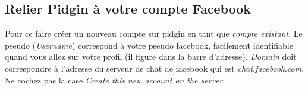 \documentclass[a4paper]{article}
\begin{document}
\subsection{Relier Pidgin à votre compte Facebook}
Pour ce faire créer un nouveau compte sur pidgin en tant que \emph{compte existant}.
Le pseudo (\emph{Username}) correspond à votre pseudo facebook, facilement identifiable quand vous
allez sur votre profil (il figure dans la barre d'adresse).
\emph{Domain} doit correspondre à l'adresse du serveur de chat de facebook qui est
\emph{chat.facebook.com}. Ne cochez pas la case \emph{Create this new account on the server}.
\end{document}
